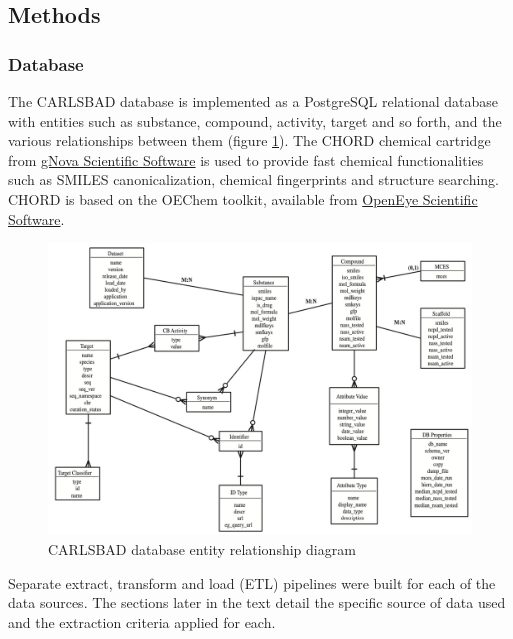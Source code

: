 \subsection{Methods}

\subsubsection{Database}

The CARLSBAD database is implemented as a PostgreSQL relational database with entities such as substance, compound, activity, target and so forth, and the various relationships between them (figure \ref{fig:cb_erd}). The CHORD chemical cartridge from \href{https://www.gnova.com/}{gNova Scientific Software} is used to provide fast chemical functionalities such as SMILES canonicalization\cite{Weininger1989-kh}, chemical fingerprints and structure searching. CHORD is based on the OEChem toolkit, available from \href{https://www.eyesopen.com/}{OpenEye Scientific Software}.

\begin{figure}
    \centering
    \includegraphics[width=\textwidth]{figures/carlsbad/CARLSBAD_ERD.png}
    \caption{CARLSBAD database entity relationship diagram}
    \label{fig:cb_erd}
\end{figure}

Separate extract, transform and load (ETL) pipelines were built for each of the data sources. The sections later in the text detail the specific source of data used and the extraction criteria applied for each.

